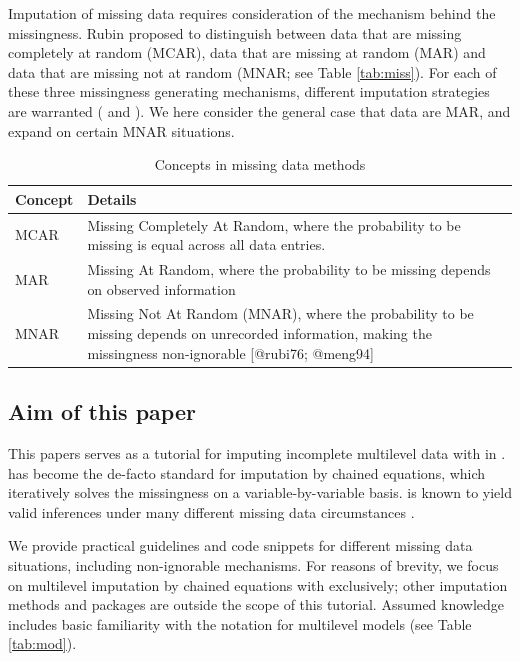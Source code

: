 \documentclass[
]{jss}
\begin{document}
Imputation of missing data requires consideration of the mechanism
behind the missingness. Rubin proposed to distinguish between data that
are missing completely at random (MCAR), data that are missing at random
(MAR) and data that are missing not at random (MNAR; see Table
\ref{tab:miss}). For each of these three missingness generating
mechanisms, different imputation strategies are warranted
(\citet{yuce08} and \citet{hox15}). We here consider the general case
that data are MAR, and expand on certain MNAR situations.

\begin{CodeChunk}
\begin{table}

\caption{\label{tab:mechanism}Concepts in missing data methods}
\centering
\begin{tabular}[t]{>{\raggedright\arraybackslash}p{3cm}>{\raggedright\arraybackslash}p{12cm}}
\toprule
Concept & Details\\
\midrule
MCAR & Missing Completely At Random, where the probability to be missing is equal across all data entries.\\
MAR & Missing At Random, where the probability to be missing depends on observed information\\
MNAR & Missing Not At Random (MNAR), where the probability to be missing depends on unrecorded information, making the missingness non-ignorable [@rubi76; @meng94]\\
\bottomrule
\end{tabular}
\end{table}

\end{CodeChunk}

\hypertarget{aim-of-this-paper}{%
\subsection{Aim of this paper}\label{aim-of-this-paper}}

This papers serves as a tutorial for imputing incomplete multilevel data
with  in .  has become the de-facto
standard for imputation by chained equations, which iteratively solves
the missingness on a variable-by-variable basis.  is known to
yield valid inferences under many different missing data circumstances
\citep{buur18}.

We provide practical guidelines and code snippets for different missing
data situations, including non-ignorable mechanisms. For reasons of
brevity, we focus on multilevel imputation by chained equations with
 exclusively; other imputation methods and packages \citep[see
e.g.][ and \citet{grun18}]{audi18} are outside the scope of this
tutorial. Assumed knowledge includes basic familiarity with the
 notation for multilevel models (see Table \ref{tab:mod}).
\end{document}
